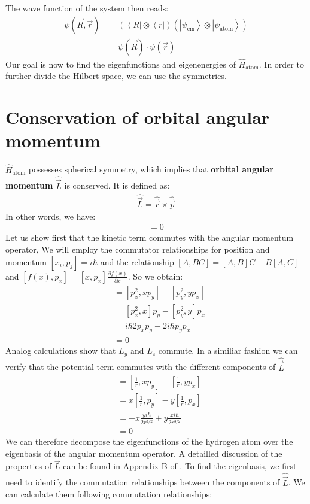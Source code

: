 \documentclass[10pt]{article}
\let\cite\citep
\providecommand\citep{\cite}
\newcommand{\bra}[1]{\ensuremath{\left\langle#1\right|}}
\newcommand{\ket}[1]{\ensuremath{\left|#1\right\rangle}}
\begin{document}
The wave function of the system then reads:
\begin{align}
\psi(\vec{R},\vec{r}) =& \left( \bra{R} \otimes \bra{r}\right)\left( \ket{\psi_\textrm{cm}} \otimes \ket{\psi_{\text{atom}}}\right)\\
=& \psi(\vec{R}) \cdot \psi (\vec{r})
\end{align}
%
Our goal is now to find the eigenfunctions and eigenenergies of $\hat{H}_\text{atom}$. In order to further divide the Hilbert space, we can use the symmetries.

\section{Conservation of orbital angular momentum}

$\hat{H}_\text{atom}$  possesses spherical symmetry, which implies that \textbf{orbital angular momentum} $\hat{\vec{L}}$ is conserved. It is defined as:
\begin{align}
\hat{\vec{L}}=\hat{\vec{r}} \times \hat{\vec{p}}
\end{align}
In other words, we have:
\begin{align}
[\hat{H}_\text{atom}, \hat{\vec{L}}] = 0
\end{align}
Let us show first that the kinetic term commutes with the angular momentum operator,
We will employ the commutator relationships for position and momentum $[x_i, p_j]=i\hbar$ and the relationship $[A,BC] = [A,B]C+B[A,C]$ and $[f(x), p_x] = [x,p_x]\frac{\partial f(x)}{\partial x}$. So we obtain:
\begin{align}
[p_x^2+p_y^2+p_z^2, xp_y - yp_x]&= [p_x^2,xp_y]-[p_y^2,yp_x] \\
 &= [p_x^2,x]p_y-[p_y^2,y] p_x\\
 &=i\hbar 2 p_xp_y-2i\hbar p_y p_x\\
 &= 0
\end{align}
Analog calculations show that $L_y$ and $L_z$ commute. In a similiar fashion we can verify that the potential term commutes with the different components of $\hat{\vec{L}}$
\begin{align}
[\frac{1}{r}, xp_y -yp_x] &= [\frac{1}{r}, xp_y]-[\frac{1}{r}, yp_x]\\
&= x[\frac{1}{r}, p_y]-y[\frac{1}{r}, p_x]\\
&= -x \frac{yi\hbar}{2r^{3/2}}+y\frac{xi\hbar}{2r^{3/2}}\\
&=0
\end{align}
We can therefore decompose the eigenfunctions of the hydrogen atom over the eigenbasis of the angular momentum operator. A detailled discussion of the properties of $\vec{L}$ can be found in Appendix B of \cite{Hertel_2015}. To find the eigenbasis, we first need to identify the commutation relationships between the components of $\hat{\vec{L}}$. We can calculate them following commutation relationships:
\end{document}
